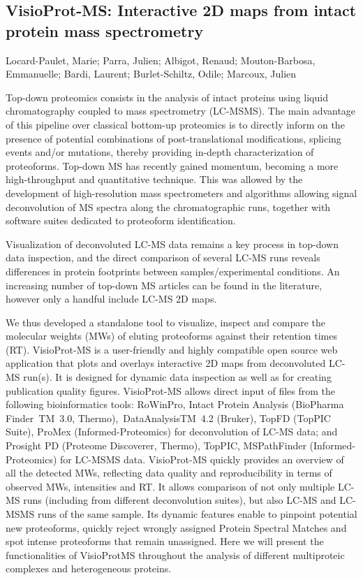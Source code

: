 
{\parindent0pt

\subsection*{\color{eubicRed} VisioProt-MS: Interactive 2D maps from intact protein mass spectrometry}
{\color{eubicGray}Locard-Paulet, Marie;
Parra, Julien;
Albigot, Renaud;
Mouton-Barbosa, Emmanuelle;
Bardi, Laurent;
Burlet-Schiltz, Odile;
Marcoux, Julien}

Top-down proteomics consists in the analysis of intact proteins using liquid chromatography coupled to mass spectrometry (LC-MSMS). The main advantage of this pipeline over classical bottom-up proteomics is to directly inform on the presence of potential combinations of post-translational modifications, splicing events and/or mutations, thereby providing in-depth characterization of proteoforms. Top-down MS has recently gained momentum, becoming a more high-throughput and quantitative technique. This was allowed by the development of high-resolution mass spectrometers and algorithms allowing signal deconvolution of MS spectra along the chromatographic runs, together with software suites dedicated to proteoform identification.

Visualization of deconvoluted LC-MS data remains a key process in top-down data inspection, and the direct comparison of several LC-MS runs reveals differences in protein footprints between samples/experimental conditions. An increasing number of top-down MS articles can be found in the literature, however only a handful include LC-MS 2D maps.

We thus developed a standalone tool to visualize, inspect and compare the molecular weights (MWs) of eluting proteoforms against their retention times (RT). VisioProt-MS is a user-friendly and highly compatible open source web application that plots and overlays interactive 2D maps from deconvoluted LC-MS run(s). It is designed for dynamic data inspection as well as for creating publication quality figures. VisioProt-MS allows direct input of files from the following bioinformatics tools: RoWinPro, Intact Protein Analysis (BioPharma Finder TM 3.0, Thermo), DataAnalysisTM 4.2 (Bruker), TopFD (TopPIC Suite), ProMex (Informed-Proteomics) for deconvolution of LC-MS data; and Prosight PD (Proteome Discoverer, Thermo), TopPIC, MSPathFinder (Informed-Proteomics) for LC-MSMS data. VisioProt-MS quickly provides an overview of all the detected MWs, reflecting data quality and reproducibility in terms of observed MWs, intensities and RT. It allows comparison of not only multiple LC-MS runs (including from different deconvolution suites), but also LC-MS and LC-MSMS runs of the same sample. Its dynamic features enable to pinpoint potential new proteoforms, quickly reject wrongly assigned Protein Spectral Matches and spot intense proteoforms that remain unassigned. Here we will present the functionalities of VisioProtMS throughout the analysis of different multiproteic complexes and heterogeneous proteins.


}
